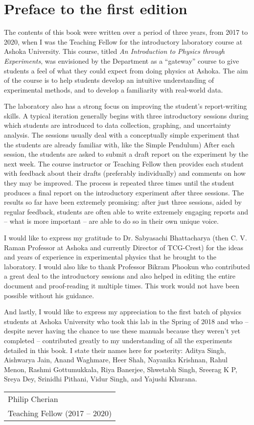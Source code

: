 \chapter*{Preface to the first edition}


The contents of this book were written over a period of three years, from 2017 to 2020, when I was the Teaching Fellow for the introductory laboratory course at Ashoka University. This course, titled \textit{An Introduction to Physics through Experiments}, was envisioned by the Department as a ``gateway'' course to give students a feel of what they could expect from doing physics at Ashoka. The aim of the course is to help students develop an intuitive understanding of experimental methods, and to develop a familiarity with real-world data.

The laboratory also has a strong focus on improving the student's report-writing skills. A typical iteration generally begins with three introductory sessions during which students are introduced to data collection, graphing, and uncertainty analysis. The sessions usually deal with a conceptually simple experiment that the students are already familiar with, like the Simple Pendulum) After each session, the students are asked to submit a draft report on the experiment by the next week. The course instructor or Teaching Fellow then provides each student with feedback about their drafts (preferably individually) and comments on how they may be improved. The process is repeated three times until the student produces a final report on the introductory experiment after three sessions. The results so far have been extremely promising: after just three sessions, aided by regular feedback, students are often able to write extremely engaging reports and -- what is more important -- are able to do so in their own unique voice.

I would like to express my gratitude to Dr. Sabyasachi Bhattacharya (then C. V. Raman Professor at Ashoka and currently Director of TCG-Crest) for the ideas and years of experience in experimental physics that he brought to the laboratory. I would also like to thank Professor Bikram Phookun who contributed a great deal to the introductory sessions and also helped in editing the entire document and proof-reading it multiple times. This work would not have been possible without his guidance. 

And lastly, I would like to express my appreciation to the first batch of physics students at Ashoka University who took this lab in the Spring of 2018 and who -- despite never having the chance to use these manuals because they weren't yet completed -- contributed greatly to my understanding of all the experiments detailed in this book. I state their names here for posterity: Aditya Singh, Aishwarya Jain, Anand Waghmare, Heer Shah, Nayanika Krishnan, Rahul Menon, Rashmi Gottumukkala, Riya Banerjee, Shwetabh Singh, Sreerag K P, Sreya Dey, Srinidhi Pithani, Vidur Singh, and Yajushi Khurana.




\hfill
\begin{tabular}{@{}l@{}}
Philip Cherian\\
Teaching Fellow (2017 -- 2020)
\end{tabular}
